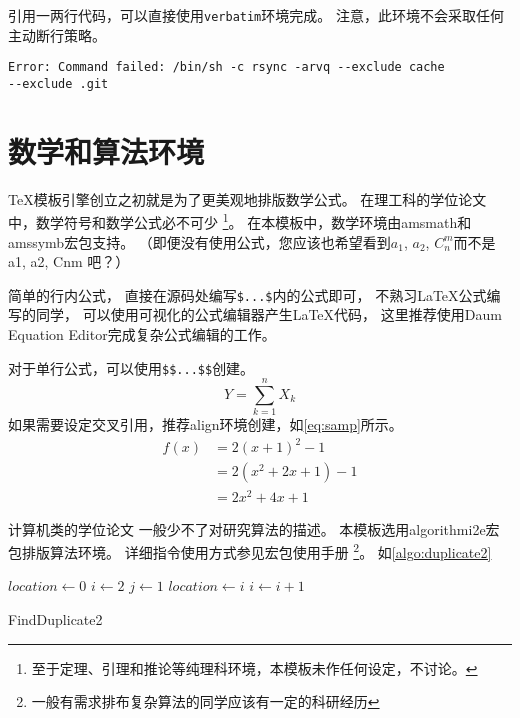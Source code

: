 引用一两行代码，可以直接使用\texttt{verbatim}环境完成。
注意，此环境不会采取任何主动断行策略。
\begin{verbatim}
Error: Command failed: /bin/sh -c rsync -arvq --exclude cache
--exclude .git 
\end{verbatim}

\section{数学和算法环境}

\TeX 模板引擎创立之初就是为了更美观地排版数学公式。
在理工科的学位论文中，数学符号和数学公式必不可少
\footnote{至于定理、引理和推论等纯理科环境，本模板未作任何设定，不讨论。}。
在本模板中，数学环境由amsmath和amssymb宏包支持。
（即便没有使用公式，您应该也希望看到$a_1$, $a_2$, $C_n^m$而不是a1, a2, Cnm 吧？）

简单的行内公式，
直接在源码处编写\texttt{\$...\$}内的公式即可，
不熟习\LaTeX 公式编写的同学，
可以使用可视化的公式编辑器产生\LaTeX 代码，
这里推荐使用Daum Equation Editor完成复杂公式编辑的工作。

对于单行公式，可以使用\texttt{\$\$...\$\$}创建。
$$Y=\sum_{k=1}^n X_k$$
如果需要设定交叉引用，推荐align环境创建，如\autoref{eq:samp}所示。
\begin{align}\label{eq:samp}
    f(x) & = 2(x + 1)^{2} - 1\\                  %
		 & = 2(x^{2} + 2x +1)-1\\
		 & = 2x^{2} + 4x + 1
\end{align}


计算机类的学位论文
一般少不了对研究算法的描述。
本模板选用algorithmi2e宏包排版算法环境。
详细指令使用方式参见宏包使用手册
\footnote{一般有需求排布复杂算法的同学应该有一定的科研经历}。
如\autoref{algo:duplicate2}

\begin{algorithm}
\DontPrintSemicolon
{}
$location \gets 0$\;
$i \gets 2$\;
 {
  $j \gets 1$\;
   {
     {
      $location \gets i$\;
    }
  }
  $i \gets i + 1$\;
}
\;
\caption{{\sc FindDuplicate2}}
\label{algo:duplicate2}
\end{algorithm}

